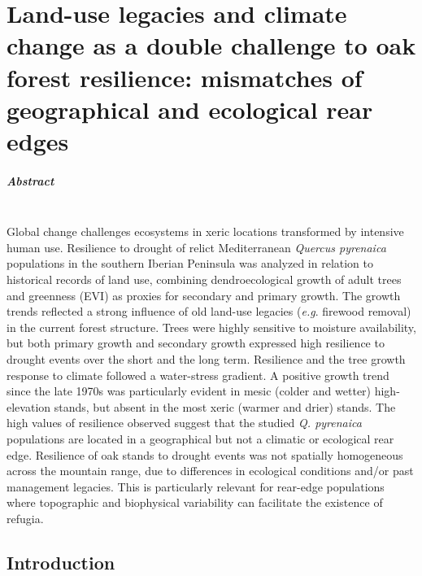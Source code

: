 %
\chapter{Land-use legacies and climate change as a double challenge to oak forest resilience: mismatches of geographical and ecological rear edges}\label{sec:dendro}

\newpage

\paragraph{Abstract} \mbox{} \\
Global change challenges ecosystems in xeric locations transformed by intensive human use. Resilience to drought of relict Mediterranean \emph{Quercus pyrenaica} populations in the southern Iberian Peninsula was analyzed in relation to historical records of land use, combining dendroecological growth of adult trees and greenness (EVI) as proxies for secondary and primary growth. The growth trends reflected a strong influence of old land-use legacies (\emph{e.g}. firewood removal) in the current forest structure. Trees were highly sensitive to moisture availability, but both primary growth and secondary growth expressed high resilience to drought events over the short and the long term. Resilience and the tree growth response to climate followed a water-stress gradient. A positive growth trend since the late 1970s was particularly evident in mesic (colder and wetter) high-elevation stands, but absent in the most xeric (warmer and drier) stands. The high values of resilience observed suggest that the studied \emph{Q. pyrenaica} populations are located in a geographical but not a climatic or ecological rear edge. Resilience of oak stands to drought events was not spatially homogeneous across the mountain range, due to differences in ecological conditions and/or past management legacies. This is particularly relevant for rear-edge populations where topographic and biophysical variability can facilitate the existence of refugia.

\newpage

\section{Introduction}\label{sec:dendro:Intro}

